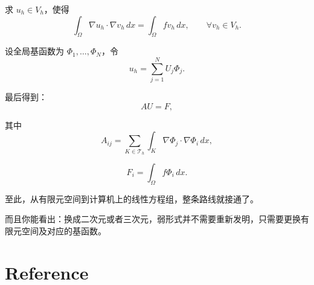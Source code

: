 求 \(u_h\in V_h\)，使得
\[
    \int_\Omega\nabla u_h\cdot\nabla v_h\,dx
    =
    \int_\Omega fv_h\,dx,
    \qquad\forall v_h\in V_h.
\]

设全局基函数为 \(\Phi_1,\ldots,\Phi_N\)，令
\[
    u_h=\sum_{j=1}^N U_j\Phi_j.
\]

最后得到：
\[
    \boxed{AU=F,}
\]

其中
\[
    \boxed{
        A_{ij}
        =
        \sum_{K\in\mathcal T_h}
        \int_K\nabla\Phi_j\cdot\nabla\Phi_i\,dx,
    }
\]

\[
    F_i=\int_\Omega f\Phi_i\,dx.
\]

至此，从有限元空间到计算机上的线性方程组，整条路线就接通了。

而且你能看出：换成二次元或者三次元，弱形式并不需要重新发明，只需要更换有限元空间及对应的基函数。




\section{Reference}




















